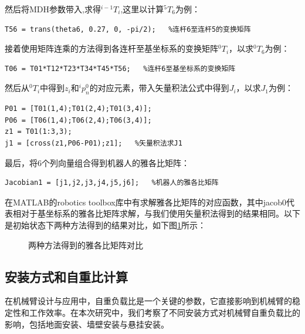 然后将MDH参数带入,求得$^{i-1}T_i$,这里以计算$^5T_6$为例：
\begin{lstlisting}
T56 = trans(theta6, 0.27, 0, -pi/2);   %连杆6至连杆5的变换矩阵
\end{lstlisting}

接着使用矩阵连乘的方法得到各连杆至基坐标系的变换矩阵$^0T_i$，以求$^0T_6$为例：
\begin{lstlisting}
T06 = T01*T12*T23*T34*T45*T56;   %连杆6至基坐标系的变换矩阵
\end{lstlisting}

然后从$^0T_i$中得到$z_i$和$^ip_n^0$的对应元素，带入矢量积法公式中得到$J_i$，以求$J_1$为例：
\begin{lstlisting}
P01 = [T01(1,4);T01(2,4);T01(3,4)];
P06 = [T06(1,4);T06(2,4);T06(3,4)];
z1 = T01(1:3,3);
j1 = [cross(z1,P06-P01);z1];   %矢量积法求J1
\end{lstlisting}

最后，将6个列向量组合得到机器人的雅各比矩阵：
\begin{lstlisting}
Jacobian1 = [j1,j2,j3,j4,j5,j6];   %机器人的雅各比矩阵
\end{lstlisting}

在MATLAB的robotics toolbox库中有求解雅各比矩阵的对应函数，其中jacob0代表相对于基坐标系的雅各比矩阵求解，与我们使用矢量积法得到的结果相同。以下是初始状态下两种方法得到的结果对比，如下图\ref{fig:13}所示：

\begin{figure}[h]
    \centering
    \caption{两种方法得到的雅各比矩阵对比}
    \label{fig:13}
\end{figure}

\subsection{安装方式和自重比计算}
在机械臂设计与应用中，自重负载比是一个关键的参数，它直接影响到机械臂的稳定性和工作效率。在本次研究中，我们考察了不同安装方式对机械臂自重负载比的影响，包括地面安装、墙壁安装与悬挂安装。

